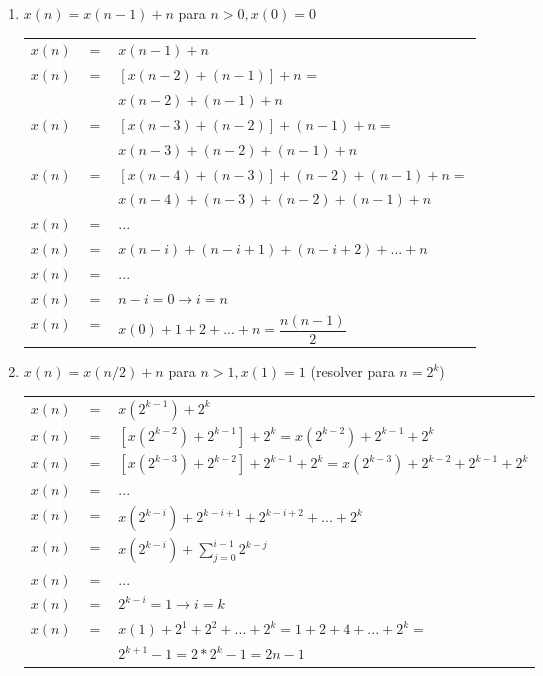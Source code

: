 \documentclass[12pt,a4paper]{article}
\begin{document}
\begin{enumerate}
\begin{enumerate}
		\item $x(n) = x(n-1)+n$ para $n>0, x(0)=0$
		
		\begin{table}[H]
			\centering
			\begin{tabular}{ccl}
				$x(n)$ & $=$ & $x(n-1)+n$\\
				$x(n)$ & $=$ & $[x(n-2)+(n-1)]+n$ = \\
				       &     & $x(n-2)+(n-1)+n $\\
				$x(n)$ & $=$ & $[x(n-3)+(n-2)]+(n-1)+n=$\\
				       &     & $x(n-3)+(n-2)+(n-1)+n$\\
				$x(n)$ & $=$ & $[x(n-4)+(n-3)]+(n-2)+(n-1)+n=$\\
				       &     & $x(n-4)+(n-3)+(n-2)+(n-1)+n$\\
				$x(n)$ & $=$ & ...\\
				$x(n)$ & $=$ & $x(n-i)+(n-i+1)+(n-i+2)+...+n$\\
				$x(n)$ & $=$ & ...\\
				$x(n)$ & $=$ & $n-i=0 \rightarrow i=n$\\
				$x(n)$ & $=$ & $x(0)+1+2+...+n = \dfrac{n(n-1)}{2}$\\
			\end{tabular}
		\end{table}
		
		\item $x(n) = x(n/2)+n$ para $n>1, x(1)=1$ (resolver para $n=2^k$)
		
		\begin{table}[H]
			\centering
			\begin{tabular}{ccl}
				$x(n)$ & $=$ & $x(2^{k-1})+2^k$\\
				$x(n)$ & $=$ & $[x(2^{k-2})+2^{k-1}]+2^k = x(2^{k-2})+2^{k-1}+2^k$\\
				$x(n)$ & $=$ & $[x(2^{k-3})+2^{k-2}]+2^{k-1}+2^k = x(2^{k-3})+2^{k-2}+2^{k-1}+2^k$\\
				$x(n)$ & $=$ & ...\\
				$x(n)$ & $=$ & $x(2^{k-i})+2^{k-i+1}+2^{k-i+2}+...+2^k$\\
				$x(n)$ & $=$ & $x(2^{k-i})+\sum_{j=0}^{i-1} 2^{k-j}$\\
				$x(n)$ & $=$ & ...\\
				$x(n)$ & $=$ & $2^{k-i}=1 \rightarrow i=k$\\
				$x(n)$ & $=$ & $x(1)+2^1+2^2+...+2^k = 1+2+4+...+2^k=$\\
				       &     & $2^{k+1}-1 = 2*2^k-1=2n-1$
			\end{tabular}
		\end{table}
	

\end{enumerate}
\end{enumerate}
\end{document}
